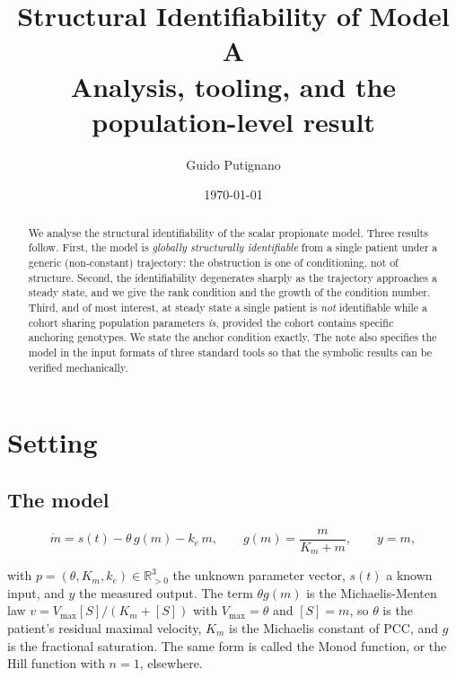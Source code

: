\documentclass[11pt,a4paper]{article}
\title{\textbf{Structural Identifiability of Model A}\\[0.3em]
\large Analysis, tooling, and the population-level result}
\author{Guido Putignano}
\date{\today}
\newcommand{\R}{\mathbb{R}}
\begin{document}
\maketitle

\begin{abstract}
\noindent
We analyse the structural identifiability of the scalar propionate model. Three results
follow. First, the model is \emph{globally structurally identifiable} from a single
patient under a generic (non-constant) trajectory: the obstruction is one of conditioning,
not of structure. Second, the identifiability degenerates sharply as
the trajectory approaches a steady state, and we give the rank condition and the growth of
the condition number. Third, and of most interest, at steady state a single patient is
\emph{not} identifiable while a cohort sharing population parameters \emph{is}, provided
the cohort contains specific anchoring genotypes. We state the anchor condition exactly.
The note also specifies the model in the input formats of three standard tools so that the
symbolic results can be verified mechanically.
\end{abstract}

\vspace{1em}

\section{Setting}

\subsection{The model}

\begin{equation}
\dot m = s(t) - \theta\, g(m) - k_e\, m,
\qquad g(m) = \frac{m}{K_m + m},
\qquad y = m,
\label{eq:A}
\end{equation}

with $p = (\theta, K_m, k_e) \in \R_{>0}^3$ the unknown parameter vector, $s(t)$ a known
input, and $y$ the measured output. The term $\theta g(m)$ is the Michaelis-Menten law
$v = V_{\max}[S]/(K_m + [S])$ with $V_{\max} = \theta$ and $[S] = m$, so $\theta$ is the
patient's residual maximal velocity, $K_m$ is the Michaelis constant of PCC, and $g$ is the
fractional saturation. The same form is called the Monod function, or the Hill function
with $n = 1$, elsewhere.
\end{document}
